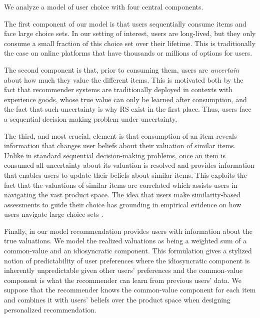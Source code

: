 \documentclass[sigconf]{acmart}
\newcommand{\xhdr}[1]{\vspace{1mm} \noindent{\bf #1}}
\begin{document}
\xhdr{Our Model.} We analyze a model of user choice with four central components.


The first component of our model is that users sequentially consume items and face large choice sets. In our setting of interest, users are long-lived, but they only consume a small fraction of this choice set over their lifetime. This is traditionally the case on online platforms that have thousands or millions of options for users.


The second component is that, prior to consuming them, users are \textit{uncertain} about how much they value the different items.
This is motivated both by the fact that recommender systems are traditionally deployed in contexts with experience goods, whose true value can only be learned after consumption, and the fact that such uncertainty is why RS exist in the first place. Thus, users face a sequential decision-making problem under uncertainty.

 
The third, and most crucial, element is that consumption of an item reveals information that changes user beliefs about their valuation of similar items. Unlike in standard sequential decision-making problems, once an item is consumed all uncertainty about its valuation is resolved and provides information that enables users to update their beliefs about similar items. This exploits the fact that the valuations of similar items are correlated which assists users in navigating the vast product space. The idea that users make similarity-based assessments to guide their choice has grounding in empirical evidence on how users navigate large choice sets \cite{schulz2019structured}.

 
Finally, in our model recommendation provides users with information about the true valuations. We model the realized valuations as being a weighted sum of a common-value and an idiosyncratic component. This formulation gives a stylized notion of predictability of user preferences where the idiosyncratic component is inherently unpredictable given other users' preferences and the common-value component is what the recommender can learn from previous users' data. We suppose that the recommender knows the common-value component for each item and combines it with users' beliefs over the product space when designing personalized recommendation.
\end{document}
